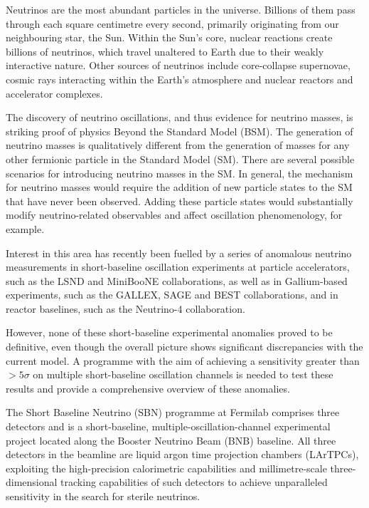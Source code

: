 

Neutrinos are the most abundant particles in the universe. Billions of them pass through each square centimetre every second, primarily originating from our neighbouring star, the Sun. Within the Sun's core, nuclear reactions create billions of neutrinos, which travel unaltered to Earth due to their weakly interactive nature. Other sources of neutrinos include core-collapse supernovae, cosmic rays interacting within the Earth's atmosphere and nuclear reactors and accelerator complexes. 

The discovery of neutrino oscillations, and thus evidence for neutrino masses, is striking proof of physics Beyond the Standard Model (BSM). 
The generation of neutrino masses is qualitatively different from the generation of masses for any other fermionic particle in the Standard Model (SM).  
There are several possible scenarios for introducing neutrino masses in the SM. In general, the mechanism for neutrino masses would require the addition of new particle states to the SM that have never been observed. Adding these particle states would substantially modify neutrino-related observables and affect oscillation phenomenology, for example. 

Interest in this area has recently been fuelled by a series of anomalous neutrino measurements in short-baseline oscillation experiments at particle accelerators, such as the LSND and MiniBooNE collaborations, as well as in Gallium-based experiments, such as the GALLEX, SAGE and BEST collaborations, and in reactor baselines, such as the Neutrino-4 collaboration.

However, none of these short-baseline experimental anomalies proved to be definitive, even though the overall picture shows significant discrepancies with the current model. A programme with the aim of achieving a sensitivity greater than $>5\sigma$ on multiple short-baseline oscillation channels is needed to test these results and provide a comprehensive overview of these anomalies.

The Short Baseline Neutrino (SBN) programme at Fermilab comprises three detectors and is a short-baseline, multiple-oscillation-channel experimental project located along the Booster Neutrino Beam (BNB) baseline. All three detectors in the beamline are liquid argon time projection chambers (LArTPCs), exploiting the high-precision calorimetric capabilities and millimetre-scale three-dimensional tracking capabilities of such detectors to achieve unparalleled sensitivity in the search for sterile neutrinos. 


